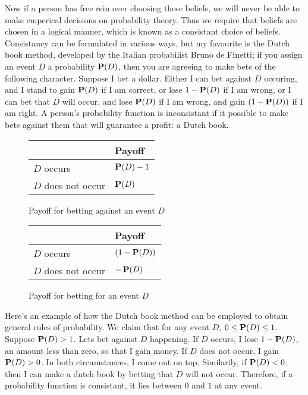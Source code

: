 Now if a person has free rein over choosing these beliefs, we will never be able to make emperical decisions on probability theory. Thus we require that beliefs are chosen in a logical manner, which is known as a consistant choice of beliefs. Consistancy can be formulated in various ways, but my favourite is the Dutch book method, developed by the Italian probabilist Bruno de Finetti; if you assign an event $D$ a probability $\operatorname{\mathbf{P}}(D)$, then you are agreeing to make bets of the following character. Suppose I bet a dollar. Either I can bet against $D$ occuring, and I stand to gain $\operatorname{\mathbf{P}}(D)$ if I am correct, or lose $1 - \operatorname{\mathbf{P}}(D)$ if I am wrong, or I can bet that $D$ will occur, and lose $\operatorname{\mathbf{P}}(D)$ if I am wrong, and gain $(1 - \operatorname{\mathbf{P}}(D))$ if I am right. A person's probability function is inconsistant if it possible to make bets against them that will guarantee a profit: a Dutch book.

\begin{figure}
\centering

\parbox{2.2in}{
    \begin{tabular}{ | l | l |}
    \hline
    & Payoff\\
    \hline
    $D$ occurs & $\operatorname{\mathbf{P}}(D) - 1$\\
    \hline
    $D$ does not occur & $\operatorname{\mathbf{P}}(D)$\\
    \hline
    \end{tabular}
    \caption{Payoff for betting against an event $D$}
}
\qquad
\parbox{2.2in}{
    \begin{tabular}{ | l | l |}
    \hline
    & Payoff\\
    \hline
    $D$ occurs & $(1 - \operatorname{\mathbf{P}}(D))$\\
    \hline
    $D$ does not occur & $-\operatorname{\mathbf{P}}(D)$\\
    \hline
    \end{tabular}
    \caption{Payoff for betting for an event $D$}
}

\end{figure}

Here's an example of how the Dutch book method can be employed to obtain general rules of probability. We claim that for any event $D$, $0 \leq \operatorname{\mathbf{P}}(D) \leq 1$. Suppose $\operatorname{\mathbf{P}}(D) > 1$. Lets bet against $D$ happening. If $D$ occurs, I lose $1 - \operatorname{\mathbf{P}}(D)$, an amount less than zero, so that I gain money. If $D$ does not occur, I gain $\operatorname{\mathbf{P}}(D) > 0$. In both circumstances, I come out on top. Similarily, if $\operatorname{\mathbf{P}}(D) < 0$, then I can make a dutch book by betting that $D$ will not occur. Therefore, if a probability function is consistant, it lies between $0$ and $1$ at any event.

